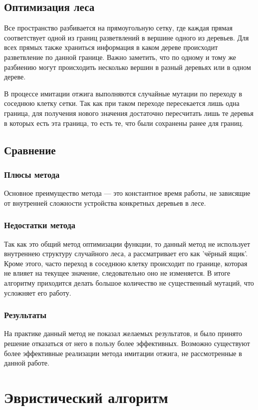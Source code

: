 \documentclass[pscyr,specification,annotation]{itmo-student-thesis}
\begin{document}
\section{Оптимизация леса}
Все пространство разбивается на прямоугольную сетку, где каждая прямая соответствует
одной из границ разветвлений в вершине одного из деревьев. 
Для всех прямых также храниться информация в каком дереве происходит разветвление
по данной границе. Важно заметить, что по одному и тому же разбиению могут происходить
несколько вершин в разный деревьях или в одном дереве.

В процессе имитации отжига выполняются случайные мутации по переходу в соседнюю клетку сетки.
Так как при таком переходе пересекается лишь одна граница, для получения нового значения
достаточно пересчитать лишь те деревья в которых есть эта граница, то есть те, что были 
сохранены ранее для границ.

\section{Сравнение}
\subsection{Плюсы метода}
Основное преимущество метода --- это константное время работы, не зависящие от внутренней сложности
устройства конкретных деревьев в лесе.

\subsection{Недостатки метода}
Так как это общий метод оптимизации функции, то данный метод не использует внутреннею 
структуру случайного леса, а рассматривает его как 'чёрный ящик'.
Кроме этого, часто переход в соседнюю клетку происходит по границе, которая не влияет
на текущее значение, следовательно оно не изменяется. В итоге алгоритму приходится
делать большое количество не существенный мутаций, что усложняет его работу.

\subsection{Результаты}
На практике данный метод не показал желаемых результатов, и было принято решение
отказаться от него в пользу более эффективных. Возможно существуют более эффективные
реализации метода имитации отжига, не рассмотренные в данной работе.


\chapter{Эвристический алгоритм}
\end{document}
